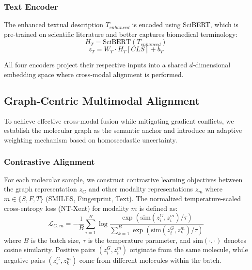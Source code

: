 \documentclass[journal]{IEEEtran}
\begin{document}
\subsubsection{Text Encoder}
The enhanced textual description $T_{enhanced}$ is encoded using SciBERT, which is pre-trained on scientific literature and better captures biomedical terminology:
\begin{equation}
H_T = \text{SciBERT}(T_{enhanced})
\end{equation}
\begin{equation}
z_T = W_T \cdot H_T[CLS] + b_T
\end{equation}

All four encoders project their respective inputs into a shared $d$-dimensional embedding space where cross-modal alignment is performed.

\subsection{Graph-Centric Multimodal Alignment}
To achieve effective cross-modal fusion while mitigating gradient conflicts, we establish the molecular graph as the semantic anchor and introduce an adaptive weighting mechanism based on homoscedastic uncertainty.

\subsubsection{Contrastive Alignment}
For each molecular sample, we construct contrastive learning objectives between the graph representation $z_G$ and other modality representations $z_m$ where $m \in \{S, F, T\}$ (SMILES, Fingerprint, Text). The normalized temperature-scaled cross-entropy loss (NT-Xent) for modality $m$ is defined as:
\begin{equation}
\mathcal{L}_{G,m} = -\frac{1}{B} \sum_{i=1}^{B} \log \frac{\exp(\text{sim}(z_i^G, z_i^m) / \tau)}{\sum_{k=1}^{B} \exp(\text{sim}(z_i^G, z_k^m) / \tau)}
\end{equation}
where $B$ is the batch size, $\tau$ is the temperature parameter, and $\text{sim}(\cdot, \cdot)$ denotes cosine similarity. Positive pairs $(z_i^G, z_i^m)$ originate from the same molecule, while negative pairs $(z_i^G, z_k^m)$ come from different molecules within the batch.
\end{document}
